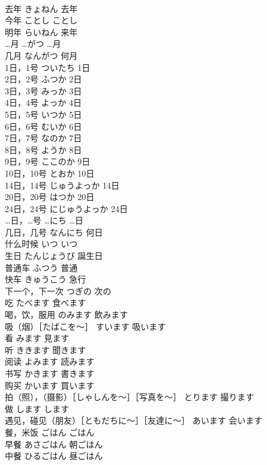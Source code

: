 \documentclass[8pt]{extreport}
\begin{document}
\begin{CJK}{UTF8}{min}
\\	去年	きょねん	去年
\\	今年	ことし	ことし
\\	明年	らいねん	来年
\\	…月	…がつ	…月
\\	几月	なんがつ	何月
\\	1日，1号	ついたち	1日
\\	2日，2号	ふつか	2日
\\	3日，3号	みっか	3日
\\	4日，4号	よっか	4日
\\	5日，5号	いつか	5日
\\	6日，6号	むいか	6日
\\	7日，7号	なのか	7日
\\	8日，8号	ようか	8日
\\	9日，9号	ここのか	9日
\\	10日，10号	とおか	10日
\\	14日，14号	じゅうよっか	14日
\\	20日，20号	はつか	20日
\\	24日，24号	にじゅうよっか	24日
\\	…日，…号	…にち	…日
\\	几日，几号	なんにち	何日
\\	什么时候	いつ	いつ
\\	生日	たんじょうび	誕生日
\\	普通车	ふつう	普通
\\	快车	きゅうこう	急行
\\	下一个，下一次	つぎの	次の
\\	吃	たべます	食べます
\\	喝，饮，服用	のみます	飲みます
\\	吸（烟）［たばこを～］	すいます	吸います
\\	看	みます	見ます
\\	听	ききます	聞きます
\\	阅读	よみます	読みます
\\	书写	かきます	書きます
\\	购买	かいます	買います
\\	拍（照），（摄影）［しゃしんを～］［写真を～］	とります	撮ります
\\	做	します	します
\\	遇见，碰见（朋友）［ともだちに～］［友達に～］	あいます	会います
\\	餐，米饭	ごはん	ごはん
\\	早餐	あさごはん	朝ごはん
\\	中餐	ひるごはん	昼ごはん

\end{CJK}
\end{document}
